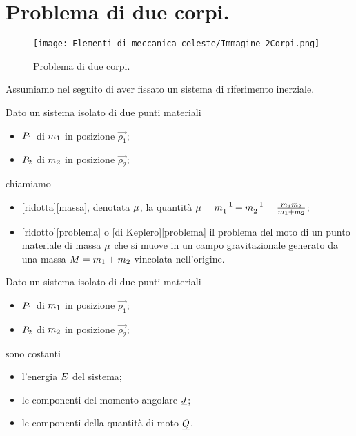 \section{Problema di due corpi.}
\label{ElementiDiMeccanicaCeleste_ProblemaDiDueCorpi}
\begin{figure}
	\texttt{[image: Elementi\_di\_meccanica\_celeste/Immagine\_2Corpi.png]}
	\centering
	\caption{Problema di due corpi.}
\end{figure}
\par Assumiamo nel seguito di aver fissato un sistema di riferimento inerziale.
\begin{Definition}
	Dato un sistema isolato di due punti materiali
	\begin{itemize}
		\item $P_1$ di $m_1$ in posizione $\vec{\rho_1}$;
		\item $P_2$ di $m_2$ in posizione $\vec{\rho_2}$;
	\end{itemize}
	chiamiamo
	\begin{itemize}
		\item {}[ridotta][massa], denotata $\mu$, la quantit\`a $\mu = m_1^{-1} + m_2^{-1} = \frac{m_1m_2}{m_1 + m_2}$;
		\item {}[ridotto][problema] o [di Keplero][problema] il problema del moto di un punto materiale di massa $\mu$ che si muove in un campo gravitazionale generato da una massa $M = m_1 + m_2$ vincolata nell'origine.
	\end{itemize}
\end{Definition}
\begin{Theorem}
	Dato un sistema isolato di due punti materiali
	\begin{itemize}
		\item $P_1$ di $m_1$ in posizione $\vec{\rho_1}$;
		\item $P_2$ di $m_2$ in posizione $\vec{\rho_2}$;
	\end{itemize}
	sono costanti 
	\begin{itemize}
		\item l'energia $E$ del sistema;
		\item le componenti del momento angolare $\underline{J}$;
		\item le componenti della quantit\`a di moto $\underline{Q}$.
	\end{itemize}
\end{Theorem}
